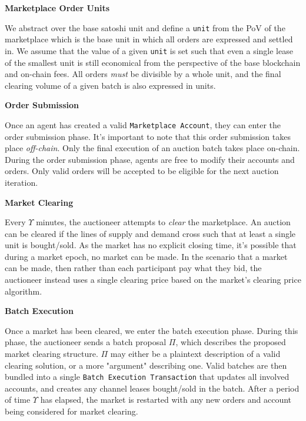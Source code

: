 \documentclass[10pt,a4paper]{article}
\theoremstyle{definition}
\begin{document}
\begin{center}
    \textbf{Marketplace Order Units}
\end{center}

We abstract over the base satoshi unit and define a \texttt{unit} from the PoV
of the marketplace which is the base unit in which all orders are expressed and
settled in. We assume that the value of a given \texttt{unit} is set such that
even a single lease of the smallest unit is still economical from the
perspective of the base blockchain and on-chain fees. All orders \emph{must} be
divisible by a whole unit, and the final clearing volume of a given batch is
also expressed in units.

\begin{center}
    \textbf{Order Submission}
\end{center}

Once an agent has created a valid \texttt{Marketplace Account}, they can enter
the order submission phase. It's important to note that this order submission
takes place \emph{off-chain}. Only the final execution of an auction batch
takes place on-chain. During the order submission phase, agents are free to
modify their accounts and orders. Only valid orders will be accepted to be
eligible for the next auction iteration.

\begin{center}
    \textbf{Market Clearing}
\end{center}

Every $\Upsilon$ minutes, the auctioneer attempts to \emph{clear} the marketplace.
An auction can be cleared if the lines of supply and demand cross such that at
least a single unit is bought/sold. As the market has no explicit closing time,
it's possible that during a market epoch, no market can be made. In the
scenario that a market can be made, then rather than each participant pay what
they bid, the auctioneer instead uses a single clearing price based on the
market's clearing price algorithm.

\begin{center}
    \textbf{Batch Execution}
\end{center}

Once a market has been cleared, we enter the batch execution phase. During this
phase, the auctioneer sends a batch proposal $\Pi$, which describes the
proposed market clearing structure. $\Pi$ may either be a plaintext description
of a valid clearing solution, or a more "argument" describing one.  Valid
batches are then bundled into a single \texttt{Batch Execution
Transaction} that updates all involved accounts, and creates any channel leases
bought/sold in the batch. After a period of time $\Upsilon$ has elapsed, the
market is restarted with any new orders and account being considered for market
clearing.
\end{document}
